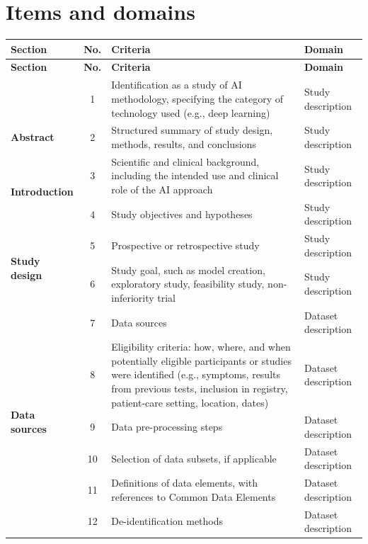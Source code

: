 \appendix
\section{Items and domains}
\label{app:table}

\begin{longtable}{|p{2cm}|c|p{7.2cm}|p{2.8cm}|}
\hline
\textbf{Section} & \textbf{No.} & \textbf{Criteria} & \textbf{Domain} \\
\hline
\endfirsthead
\hline
\textbf{Section} & \textbf{No.} & \textbf{Criteria} & \textbf{Domain} \\
\hline
\endhead
\hline
\endfoot
\footnotesize
\multirow{1}{=}{\textbf{Title}}
 & 1 & Identification as a study of AI methodology, specifying the category of technology used (e.g., deep learning) & Study description \\
\hline
\multirow{1}{=}{\textbf{Abstract}}
 & 2 & Structured summary of study design, methods, results, and conclusions & Study description \\
\hline
\multirow{2}{=}{\textbf{Introduction}}
 & 3 & Scientific and clinical background, including the intended use and clinical role of the AI approach & Study description \\
\cline{2-4}
 & 4 & Study objectives and hypotheses & Study description \\
\hline
\multirow{2}{=}{\textbf{Study design}}
 & 5 & Prospective or retrospective study & Study description \\
\cline{2-4}
 & 6 & Study goal, such as model creation, exploratory study, feasibility study, non-inferiority trial & Study description \\
\hline
\multirow{7}{=}{\textbf{Data sources}}
 & 7 & Data sources & Dataset description \\
\cline{2-4}
 & 8 & Eligibility criteria: how, where, and when potentially eligible participants or studies were identified (e.g., symptoms, results from previous tests, inclusion in registry, patient-care setting, location, dates) & Dataset description \\
\cline{2-4}
 & 9 & Data pre-processing steps & Dataset description \\
\cline{2-4}
 & 10 & Selection of data subsets, if applicable & Dataset description \\
\cline{2-4}
 & 11 & Definitions of data elements, with references to Common Data Elements & Dataset description \\
\cline{2-4}
 & 12 & De-identification methods & Dataset description \\

\end{longtable}
